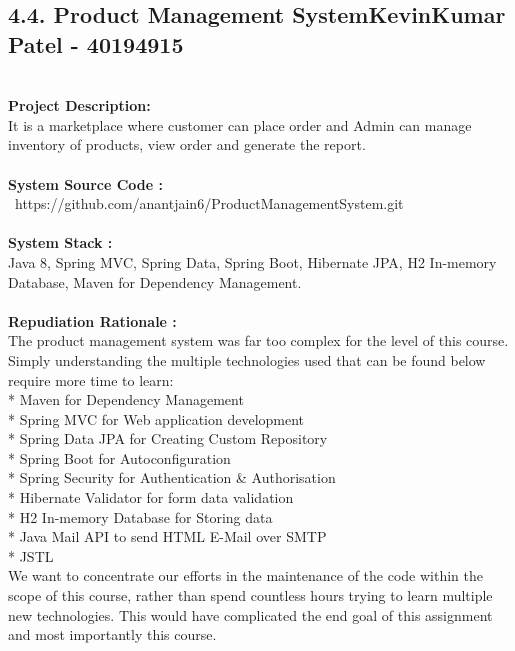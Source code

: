 \documentclass[letterpaper, 11pt]{report}
\begin{document}
\subsection*{4.4. Product Management System\hfill {\normalsize{KevinKumar Patel - 40194915}}} \\
\normalsize {\textbf{Project Description:}} \\
\normalsize {It is a marketplace where customer can place order and Admin can manage inventory of products, view order and generate the report.}\\
\\
\normalsize{\textbf{System Source Code :}} \\
\normalsize{\ https://github.com/anantjain6/ProductManagementSystem.git}\\
\\
\normalsize{\textbf{System Stack :}}\\
\normalsize{Java 8, Spring MVC, Spring Data, Spring Boot, Hibernate JPA, H2 In-memory Database, Maven for Dependency Management.}\\
\\
\normalsize{\textbf{Repudiation Rationale : }}\\
\normalsize{The product management system was far too complex for the level of this course. Simply understanding the multiple technologies used that can be found below require more time to learn:\\
* Maven for Dependency Management\\
* Spring MVC for Web application development\\
* Spring Data JPA for Creating Custom Repository\\
* Spring Boot for Autoconfiguration\\
* Spring Security for Authentication & Authorisation\\
* Hibernate Validator for form data validation\\
* H2 In-memory Database for Storing data\\
* Java Mail API to send HTML E-Mail over SMTP\\
* JSTL\\
We want to concentrate our efforts in the maintenance of the code within the scope of this course, rather than spend countless hours trying to learn multiple new technologies. This would have complicated the end goal of this assignment and most importantly this course.}
\\
\end{document}
